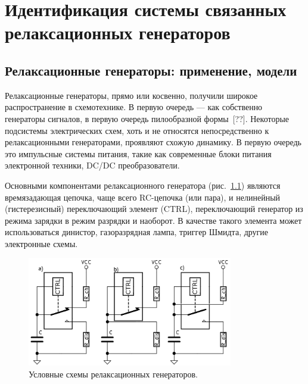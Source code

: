 \chapter{Идентификация системы связанных релаксационных генераторов}

\newcommand{\RelaxBjtIi}{системы из трёх связанных релаксационных генераторов на паре комплиментарных транзисторов}
\newcommand{\RelaxShIi}{системы из трёх связанных релаксационных генераторов на основе триггеров Шмидта}

\section{Релаксационные генераторы: применение, модели}


Релаксационные генераторы, прямо или косвенно, получили широкое распространение
в схемотехнике. В первую очередь --- как собственно генераторы
сигналов, в первую очередь пилообразной формы~[??].
Некоторые подсистемы электрических схем, хоть и не относятся непосредственно к
релаксационными генераторами, проявляют схожую динамику.
В первую очередь это импульсные системы питания, такие как
современные блоки питания электронной техники, DC/DC преобразователи.

Основными компонентами релаксационного генератора
(рис.~\ref{atu:f:relax_types})
являются
времязадающая цепочка, чаще всего RC-цепочка (или пара),
и нелинейный (гистерезисный) переключающий элемент (CTRL),
переключающий генератор из режима зарядки в режим разрядки и наоборот.
В качестве такого элемента может использоваться
динистор, газоразрядная лампа, триггер Шмидта,
другие электронные схемы.

\begin{figure}[htb!]
  \centerline{\includegraphics[width=0.8\textwidth]{p/relax_types.png} }
  \caption{Условные схемы релаксационных генераторов.}
  \label{atu:f:relax_types}
\end{figure}

